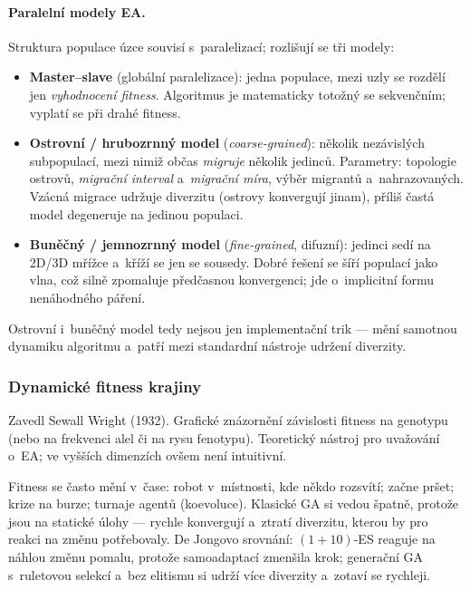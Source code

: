 \documentclass[11pt,a4paper]{article}
\theoremstyle{definition}
\begin{document}
\paragraph{Paralelní modely EA.} Struktura populace úzce souvisí
s~paralelizací; rozlišují se tři modely:
\begin{itemize}
\item \textbf{Master--slave} (globální paralelizace): jedna populace, mezi
  uzly se rozdělí jen \emph{vyhodnocení fitness}. Algoritmus je matematicky
  totožný se sekvenčním; vyplatí se při drahé fitness.
\item \textbf{Ostrovní / hrubozrnný model} (\emph{coarse-grained}): několik
  nezávislých subpopulací, mezi nimiž občas \emph{migruje} několik jedinců.
  Parametry: topologie ostrovů, \emph{migrační interval} a~\emph{migrační
  míra}, výběr migrantů a~nahrazovaných. Vzácná migrace udržuje diverzitu
  (ostrovy konvergují jinam), příliš častá model degeneruje na jedinou populaci.
\item \textbf{Buněčný / jemnozrnný model} (\emph{fine-grained}, difuzní):
  jedinci sedí na 2D/3D mřížce a~kříží se jen se sousedy. Dobré řešení se šíří
  populací jako vlna, což silně zpomaluje předčasnou konvergenci; jde
  o~implicitní formu nenáhodného páření.
\end{itemize}
Ostrovní i~buněčný model tedy nejsou jen implementační trik --- mění samotnou
dynamiku algoritmu a~patří mezi standardní nástroje udržení diverzity.

\subsubsection{Dynamické fitness krajiny}

\begin{defbox}
Zavedl Sewall Wright (1932). Grafické znázornění závislosti fitness na genotypu
(nebo na frekvenci alel či na rysu fenotypu). Teoretický nástroj pro
uvažování o~EA; ve vyšších dimenzích ovšem není intuitivní.
\end{defbox}

Fitness se často mění v~čase: robot v~místnosti, kde někdo rozsvítí; začne
pršet; krize na burze; turnaje agentů (koevoluce). Klasické GA si vedou špatně,
protože jsou  na statické úlohy --- rychle konvergují a~ztratí
diverzitu, kterou by pro reakci na změnu potřebovaly.
De Jongovo srovnání: $(1+10)$-ES reaguje na náhlou změnu pomalu, protože
samoadaptací zmenšila krok; generační GA s~ruletovou selekcí a~bez elitismu
si udrží více diverzity a~zotaví se rychleji.
\end{document}
